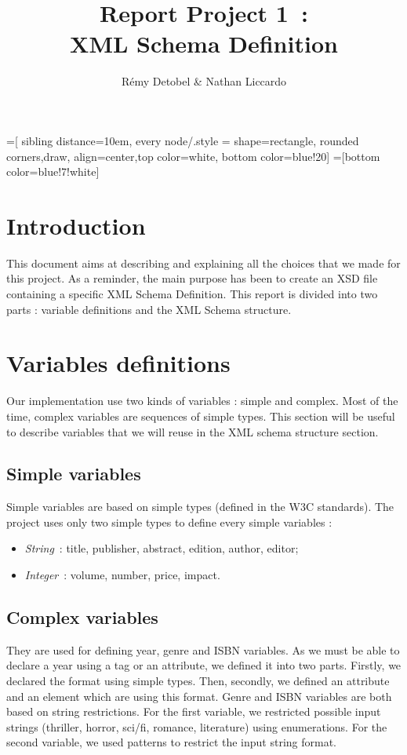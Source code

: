 \documentclass{article}
\author{R\'emy Detobel \& Nathan Liccardo}
\title{Report Project 1~:\\XML Schema Definition}
\begin{document}
=[
  sibling distance=10em,
  every node/.style = {shape=rectangle, rounded corners,draw, align=center,top color=white, bottom color=blue!20}]
=[bottom color=blue!7!white]

\maketitle

\section{Introduction}
This document aims at describing and explaining all the choices that we made for this project. As a reminder, the main purpose has been to create an XSD file containing a specific XML Schema Definition. This report is divided into two parts : variable definitions and the XML Schema structure. 

\section{Variables definitions}
  \label{sec:variables}
  Our implementation use two kinds of variables : simple and complex. Most of the time, complex variables are sequences of simple types. This section will be useful to describe variables that we will reuse in the XML schema structure section.
\subsection{Simple variables}
Simple variables are based on simple types (defined in the W3C standards). The project uses only two simple types to define every simple variables :
  \begin{itemize}
    \item \textit{String}~: title, publisher, abstract, edition, author, editor;
    \item \textit{Integer}~: volume, number, price, impact.
  \end{itemize}
\subsection{Complex variables}
They are used for defining year, genre and ISBN variables. As we must be able to declare a year using a tag or an attribute, we defined it into two parts. Firstly, we declared the format using simple types. Then, secondly, we defined an attribute and an element which are using this format. Genre and ISBN variables are both based on string restrictions. For the first variable, we restricted possible input strings (thriller, horror, sci/fi, romance, literature) using enumerations. For the second variable, we used patterns to restrict the input string format.
  
\end{document}
